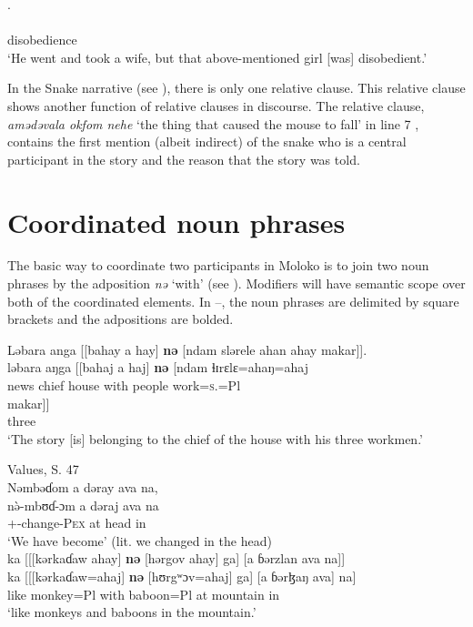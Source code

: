       \medskip
 [cezlere  ga].\\     
\gll [tʃɛɮɛrɛ       ga]\\
     disobedience {\ADJ}\\
\glt  ‘He went and took a wife, but that above-mentioned girl [was] disobedient.’
\z

In the Snake narrative (see ), there is only one relative clause. This relative clause shows another function of relative clauses in discourse. The relative clause, \textit{amədəvala okfom nehe} ‘the thing that caused the mouse to fall’ in line 7 , contains the first mention (albeit indirect) of the snake who is a central participant in the story and the reason that the story was told. 

\section{Coordinated noun phrases}\label{sec:5.5}
\hypertarget{RefHeading1211801525720847}{}
The basic way to coordinate two participants in Moloko is to join two noun phrases by the adposition \textit{nə} ‘with’ (see ). Modifiers will have semantic scope over both of the coordinated elements. In --, the noun phrases are delimited by square brackets and the adpositions are bolded. 

\ea \label{ex:5:117}
Ləbara  anga  [[bahay  a  hay]  \textbf{nə}  [ndam  slərele  ahan  ahay  makar]].\\
\gll  ləbara  aŋga  [[bahaj   a   haj]  \textbf{nə}  [ndam   ɬɪrɛlɛ=ahaŋ=ahaj \\          
      news  {\POSS}  chief  {\GEN}  house  with  people  work=\textsc{s}.{\POSS}=Pl\\    
      
      \medskip
\gll makar]]\\
     three\\
\glt  ‘The story [is] belonging to the chief of the house with his three workmen.’
\z

\clearpage
\ea \label{ex:5:118}\corpussource Values, S. 47\\
Nəmbəɗom  a  dəray  ava  na, \\ 
\gll  n\`{ə}-mbʊɗ{}-ɔm      a  dəraj  ava  na\\
      {\oneS}+{\PFV}-change-\textsc{Pex}  at   head  in    {\PSP}\\
\glt  ‘We have become’ (lit. we changed in the head)\\
\medskip
ka [[[kərkaɗaw  ahay]  \textbf{nə}  [hərgov  ahay]  ga]  [a  ɓərzlan  ava   na]]\\
\gll  ka [[[kərkaɗaw=ahaj] \textbf{nə} [hʊrgʷɔv=ahaj] ga] [a  ɓərɮaŋ ava] na]\\
      like        monkey=Pl        with    baboon=Pl  {\ADJ}  at    mountain    in    {\PSP}\\
\glt  ‘like monkeys and baboons in the mountain.’
\z

